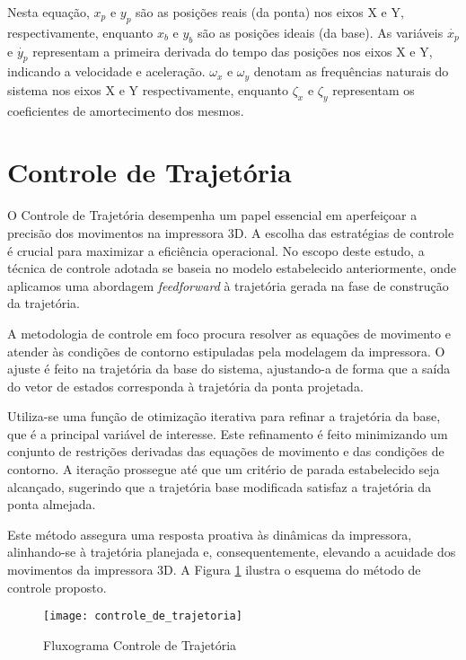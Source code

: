 Nesta equação, \(x_p\) e \(y_p\) são as posições reais (da ponta) nos eixos X e Y, respectivamente, enquanto \(x_b\) e \(y_b\) são as posições ideais (da base). As variáveis \(\dot{x_p}\) e \(\dot{y_p}\) representam a primeira derivada do tempo das posições nos eixos X e Y, indicando a velocidade e aceleração. \(\omega _x\) e \(\omega _y\) denotam as frequências naturais do sistema nos eixos X e Y respectivamente, enquanto \(\zeta _x\) e \(\zeta _y\) representam os coeficientes de amortecimento dos mesmos.

\section{Controle de Trajetória}
O Controle de Trajetória desempenha um papel essencial em aperfeiçoar a precisão dos movimentos na impressora 3D. A escolha das estratégias de controle é crucial para maximizar a eficiência operacional. No escopo deste estudo, a técnica de controle adotada se baseia no modelo estabelecido anteriormente, onde aplicamos uma abordagem \textit{feedforward} à trajetória gerada na fase de construção da trajetória.

A metodologia de controle em foco procura resolver as equações de movimento e atender às condições de contorno estipuladas pela modelagem da impressora. O ajuste é feito na trajetória da base do sistema, ajustando-a de forma que a saída do vetor de estados corresponda à trajetória da ponta projetada.

Utiliza-se uma função de otimização iterativa para refinar a trajetória da base, que é a principal variável de interesse. Este refinamento é feito minimizando um conjunto de restrições derivadas das equações de movimento e das condições de contorno. A iteração prossegue até que um critério de parada estabelecido seja alcançado, sugerindo que a trajetória base modificada satisfaz a trajetória da ponta almejada.

Este método assegura uma resposta proativa às dinâmicas da impressora, alinhando-se à trajetória planejada e, consequentemente, elevando a acuidade dos movimentos da impressora 3D. A Figura \ref{fig:controle_de_trajetoria} ilustra o esquema do método de controle proposto.

\begin{figure}[H]
    \centering
    \caption{Fluxograma Controle de Trajetória}
    \texttt{[image: controle\_de\_trajetoria]}

    \label{fig:controle_de_trajetoria}
\end{figure}

